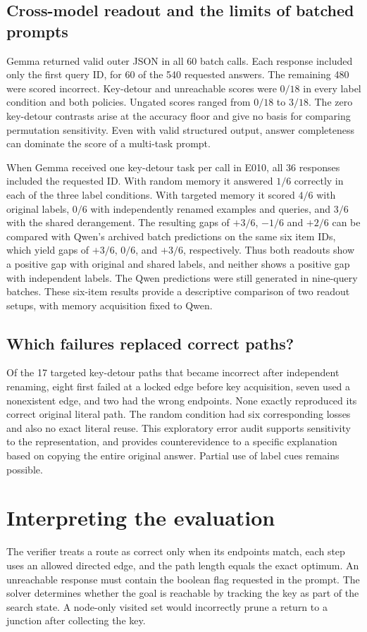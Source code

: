 \documentclass[11pt]{article}
\begin{document}
\subsection{Cross-model readout and the limits of batched prompts}

Gemma returned valid outer JSON in all 60 batch calls. Each
response included only the first query ID, for 60 of the 540
requested answers. The remaining 480 were scored incorrect.
Key-detour and unreachable scores were $0/18$ in every label
condition and both policies. Ungated scores ranged from $0/18$
to $3/18$. The zero key-detour contrasts arise at the accuracy
floor and give no basis for comparing permutation sensitivity.
Even with valid structured output, answer completeness can dominate
the score of a multi-task prompt.

When Gemma received one key-detour task per call in E010, all
36 responses included the requested ID. With random memory it
answered $1/6$ correctly in each of the three label conditions.
With targeted memory it scored $4/6$ with original labels, $0/6$
with independently renamed examples and queries, and $3/6$ with
the shared derangement. The resulting gaps of $+3/6$, $-1/6$ and
$+2/6$ can be compared with Qwen's archived batch predictions on
the same six item IDs, which yield gaps of $+3/6$, $0/6$, and
$+3/6$, respectively.
Thus both readouts show a positive gap with original and shared labels,
and neither shows a positive gap with independent labels. The Qwen
predictions were still generated in nine-query batches. These
six-item results provide a descriptive comparison of two readout
setups, with memory acquisition fixed to Qwen.

\subsection{Which failures replaced correct paths?}

Of the 17 targeted key-detour paths that became incorrect after
independent renaming, eight first failed at a locked edge before
key acquisition, seven used a nonexistent edge, and two had the
wrong endpoints. None exactly reproduced its correct original
literal path. The random condition had six corresponding losses
and also no exact literal reuse. This exploratory error audit
supports sensitivity to the representation, and provides
counterevidence to a specific explanation based on copying the
entire original answer. Partial use of label cues remains possible.

\section{Interpreting the evaluation}
The verifier treats a route as correct only when its endpoints match,
each step uses an allowed directed edge, and the path length equals
the exact optimum. An unreachable response must contain the boolean
flag requested in the prompt. The solver determines whether the goal
is reachable by tracking the key as part of the search state. A
node-only visited set would incorrectly prune a return to a junction
after collecting the key.
\end{document}
